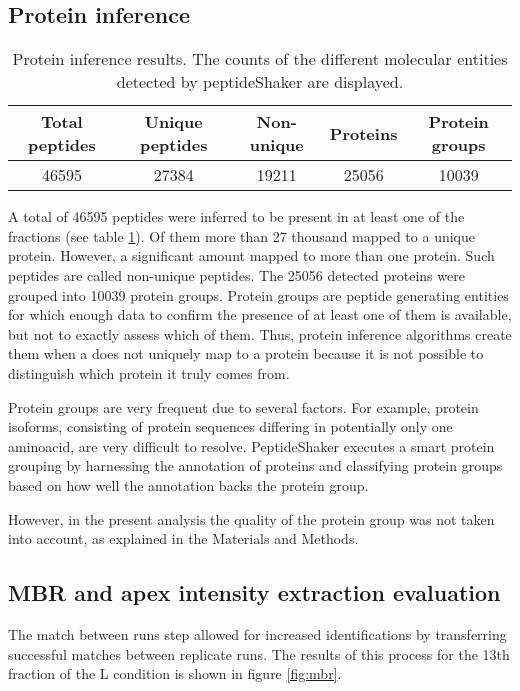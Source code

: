 \subsection{Protein inference}

\begin{table}[H]
\begin{tabular}{ccccc}
  \toprule
 Total peptides & Unique peptides & Non-unique & Proteins & Protein groups \\ 
  \midrule
 46595 & 27384 & 19211 & 25056 & 10039 \\
 \bottomrule
\end{tabular}
\caption[rotein inference results]{Protein inference results. The counts of the different molecular entities detected by peptideShaker are displayed.}
\label{tab:protein_inference}
\end{table}

A total of 46595 peptides were inferred to be present in at least one of the fractions (see table \ref{tab:protein_inference}). Of them more than 27 thousand mapped to a unique protein. However, a significant amount mapped to more than one protein. Such peptides are called non-unique peptides. The 25056 detected proteins were grouped into 10039 protein groups. Protein groups are peptide generating entities for which enough data to confirm the presence of at least one of them is available, but not to exactly assess which of them. Thus, protein inference algorithms create them when a does not uniquely map to a protein because it is not possible to distinguish which protein it truly comes from.

Protein groups are very frequent due to several factors. For example, protein isoforms, consisting of protein sequences differing in potentially only one aminoacid, are very difficult to resolve. PeptideShaker executes a smart protein grouping by harnessing the annotation of proteins and classifying protein groups based on how well the annotation backs the protein group.

However, in the present analysis the quality of the protein group was not taken into account, as explained in the Materials and Methods.


\subsection{MBR and apex intensity extraction evaluation}

The match between runs step allowed for increased identifications by transferring successful matches between replicate runs. The results of this process for the 13th fraction of the L condition is shown in figure \ref{fig:mbr}.

